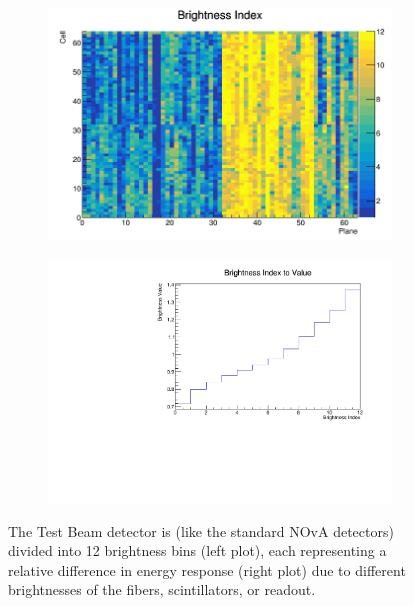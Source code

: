 \documentclass[12pt,a4paper]{article}
\begin{document}
\begin{figure}[hbtp]
\centering
\begin{subfigure}[b]{0.495\textwidth}
\centering
\includegraphics[width=\textwidth]{Plots/BrightnessIndex.png}
\end{subfigure}
\begin{subfigure}[b]{0.495\textwidth}
\centering
\includegraphics[width=\textwidth]{Plots/BrightnessIndexToValue.pdf}
\end{subfigure}
\caption{The Test Beam detector is (like the standard NOvA detectors) divided into 12 brightness bins (left plot), each representing a relative difference in energy response (right plot) due to different brightnesses of the fibers, scintillators, or readout.}
\label{figFiberBrightnessBins}
\end{figure}
\end{document}
